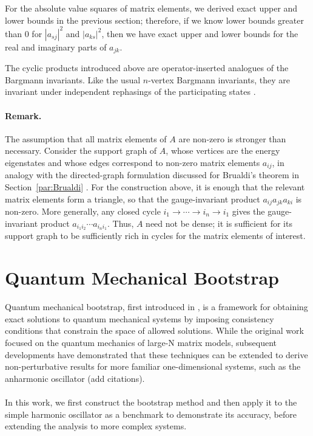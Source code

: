 \documentclass{article}
\theoremstyle{definition}
\begin{document}
For the absolute value squares of matrix elements, we derived exact upper and lower bounds in the previous section; therefore, if we know lower bounds greater than $ 0$ for $|a_{sj}|^2$ and $|a_{ks}|^2$, then we have exact upper and lower bounds for the real and imaginary parts of $a_{jk}$.

The cyclic products introduced above are operator-inserted analogues of the Bargmann invariants. Like the usual \(n\)-vertex Bargmann invariants, they are invariant under independent rephasings of the participating states \cite{paper:Mukunda2001Bargmann,paper:Bargmann1964Wigner}.

\paragraph{Remark.}
The assumption that all matrix elements of $A$ are non-zero is stronger than necessary. Consider the support graph of $A$, whose vertices are the energy eigenstates and whose edges correspond to non-zero matrix elements $a_{ij}$, in analogy with the directed-graph formulation discussed for Brualdi's theorem in Section~\ref{par:Brualdi} \cite{paper:Brualdi1982}. For the construction above, it is enough that the relevant matrix elements form a triangle, so that the gauge-invariant product $a_{ij}a_{jk}a_{ki}$ is non-zero. More generally, any closed cycle $i_1\to\cdots\to i_n\to i_1$ gives the gauge-invariant product $a_{i_1i_2}\cdots a_{i_ni_1}$. Thus, $A$ need not be dense; it is sufficient for its support graph to be sufficiently rich in cycles for the matrix elements of interest.


\section{Quantum Mechanical Bootstrap}
Quantum mechanical bootstrap, first introduced in \cite{PhysRevLett.125.041601}, is a framework for obtaining exact solutions to quantum mechanical systems by imposing consistency conditions that constrain the space of allowed solutions. While the original work focused on the quantum mechanics of large-N matrix models, subsequent developments have demonstrated that these techniques can be extended to derive non-perturbative results for more familiar one-dimensional systems, such as the anharmonic oscillator \cite{Berenstein:2021dyf} (add citations).
\\
\\
In this work, we first construct the bootstrap method and then apply it to the simple harmonic oscillator as a benchmark to demonstrate its accuracy, before extending the analysis to more complex systems.
\end{document}
